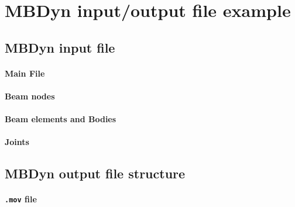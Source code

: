 \chapter{MBDyn input/output file example}
\label{app:mbdyn-file}

\section{MBDyn input file}
\label{sec:mbdyn-input-file}

\subsubsection{Main File}



\subsubsection{Beam nodes}



\subsubsection{Beam elements and Bodies}



\subsubsection{Joints}



\section{MBDyn output file structure}
\label{sec:mbdyn-output-file}

\subsubsection{\texttt{.mov} file}

